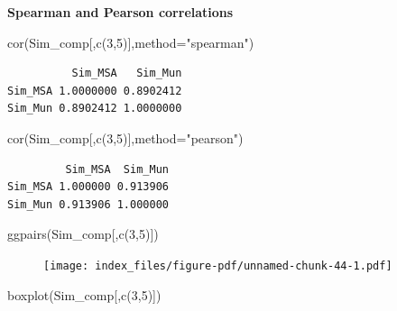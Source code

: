 \documentclass[
  letterpaper,
  DIV=11,
  numbers=noendperiod]{scrreprt}
\newenvironment{Shaded}{\begin{snugshade}}{\end{snugshade}}
\newcommand{\AttributeTok}[1]{\textcolor[rgb]{0.40,0.45,0.13}{#1}}
\newcommand{\DecValTok}[1]{\textcolor[rgb]{0.68,0.00,0.00}{#1}}
\newcommand{\FunctionTok}[1]{\textcolor[rgb]{0.28,0.35,0.67}{#1}}
\newcommand{\NormalTok}[1]{\textcolor[rgb]{0.00,0.23,0.31}{#1}}
\newcommand{\StringTok}[1]{\textcolor[rgb]{0.13,0.47,0.30}{#1}}
\begin{document}
\textbf{Spearman and Pearson correlations}

\begin{Shaded}
\begin{Highlighting}[]
\FunctionTok{cor}\NormalTok{(Sim\_comp[,}\FunctionTok{c}\NormalTok{(}\DecValTok{3}\NormalTok{,}\DecValTok{5}\NormalTok{)],}\AttributeTok{method=}\StringTok{"spearman"}\NormalTok{)}
\end{Highlighting}
\end{Shaded}

\begin{verbatim}
          Sim_MSA   Sim_Mun
Sim_MSA 1.0000000 0.8902412
Sim_Mun 0.8902412 1.0000000
\end{verbatim}

\begin{Shaded}
\begin{Highlighting}[]
\FunctionTok{cor}\NormalTok{(Sim\_comp[,}\FunctionTok{c}\NormalTok{(}\DecValTok{3}\NormalTok{,}\DecValTok{5}\NormalTok{)],}\AttributeTok{method=}\StringTok{"pearson"}\NormalTok{)}
\end{Highlighting}
\end{Shaded}

\begin{verbatim}
         Sim_MSA  Sim_Mun
Sim_MSA 1.000000 0.913906
Sim_Mun 0.913906 1.000000
\end{verbatim}

\begin{Shaded}
\begin{Highlighting}[]
\FunctionTok{ggpairs}\NormalTok{(Sim\_comp[,}\FunctionTok{c}\NormalTok{(}\DecValTok{3}\NormalTok{,}\DecValTok{5}\NormalTok{)])}
\end{Highlighting}
\end{Shaded}

\begin{figure}[H]

{\centering \texttt{[image: index\_files/figure-pdf/unnamed-chunk-44-1.pdf]}

}

\end{figure}

\begin{Shaded}
\begin{Highlighting}[]
\FunctionTok{boxplot}\NormalTok{(Sim\_comp[,}\FunctionTok{c}\NormalTok{(}\DecValTok{3}\NormalTok{,}\DecValTok{5}\NormalTok{)])}
\end{Highlighting}
\end{Shaded}
\end{document}
